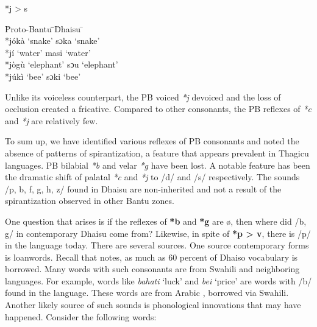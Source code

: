 \documentclass[output=paper,colorlinks,citecolor=brown]{langscibook}
\begin{document}
\ea%
    \label{ex:ngonyani:10}
    *j > s\\
	\begin{tabbing} 
        \= Proto-Bantu \quad\= \quad\= \quad\= \quad\= \quad\= \quad\= \quad\= Dhaisu \quad\=  \quad\= \\
        \>  *jókà
        \> ‘snake’
        \> \> \>  \> \> \> sɔka
        \> ‘snake’\\
        
        \> *jí
        \> ‘water’
        \> \> \>  \> \> \> masi
        \> ‘water’\\
        
        \> *jògù
        \> ‘elephant’
        \> \> \>  \> \> \> sɔu
        \> ‘elephant’\\
        
        \> *júkì
        \> ‘bee’
        \> \> \>  \> \> \> sɔki
        \> ‘bee’
    \end{tabbing}
\z

Unlike its voiceless counterpart, the PB voiced \textit{*j} devoiced and the loss of occlusion  created a fricative. Compared to other consonants, the PB reflexes of \textit{*c} and \textit{*j} are relatively few.

To sum up, we have identified various reflexes of PB consonants and noted the absence of patterns of spirantization, a feature that appears prevalent in Thagicu languages. PB bilabial \textit{*b} and velar \textit{*g}  have been lost. A notable feature has been the dramatic shift of palatal \textit{*c }and \textit{*j} to /d/ and /s/ respectively. The sounds /p, b, f, g, h, z/ found in Dhaisu are non-inherited \citep{Nurse2000}  and not a result of the spirantization observed in other Bantu zones. 
     
One question that arises is if the reflexes of \textbf{*b} and \textbf{*g} are ø, then where did /b, g/ in contemporary Dhaisu come from? Likewise, in spite of \textbf{*p > v}, there is /p/ in the language today. There are several sources. One source contemporary forms is loanwords. Recall that \cite[20]{Nurse2000} notes, as much as 60 percent of Dhaiso vocabulary is borrowed. Many words with such consonants are from Swahili and neighboring languages. For example, words like \textit{bahati }‘luck’ and \textit{bei} ‘price’ are words with /b/ found in the language. These words are from Arabic \citep{TUKI1996}, borrowed via Swahili. Another likely source of such sounds is phonological innovations that may have happened. Consider the following words:
\end{document}
